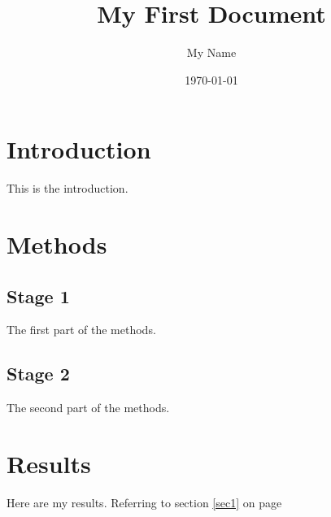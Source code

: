 \documentclass[a4paper, 12pt]{article}
\begin{document}
\title{My First Document}
\author{My Name}
\date{\today}
\maketitle

\section{Introduction}
This is the introduction.

\section{Methods}

\subsection{Stage 1}
The first part of the methods.

\subsection{Stage 2}
The second part of the methods.

\section{Results}
Here are my results. Referring to section \ref{sec1} on page \pageref{sec1}
\end{document}
